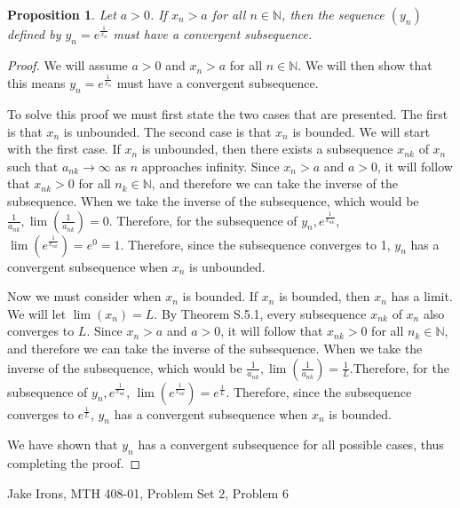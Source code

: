 \documentclass[11 pt]{article}
\newtheorem{proposition}{Proposition}
\newcommand{\newpar}{\vspace{.15in}\noindent}
\begin{document}
\newpar
\begin{proposition}
Let $a>0$. If $x_n>a$ for all $n\in\mathbb{N}$, then the sequence $(y_n)$ defined by $y_n=e^\frac{1}{x_n}$ must have a convergent subsequence.
\end{proposition}
\begin{proof}
\newpar 
We will assume $a>0$ and $x_n>a$ for all $n\in\mathbb{N}$. We will then show that this means $y_n=e^\frac{1}{x_n}$ must have a convergent subsequence.

\newpar
To solve this proof we must first state the two cases that are presented. The first is that $x_n$ is unbounded. The second case is that $x_n$ is bounded. We will start with the first case. If $x_n$ is unbounded, then there exists a subsequence ${x_{nk}}$ of ${x_n}$ such that ${a_{nk}}\rightarrow \infty$ as $n$ approaches infinity. Since $x_n>a$ and $a>0$, it will follow that $x_{nk}>0$ for all $n_k\in\mathbb{N}$, and therefore we can take the inverse of the subsequence. When we take the inverse of the subsequence, which would be $\frac{1}{a_{nk}}, \lim(\frac{1}{a_{nk}})=0$. Therefore, for the subsequence of $y_n, e^\frac{1}{x_{nk}}$, $\lim(e^\frac{1}{x_{nk}})=e^0=1$. Therefore, since the subsequence converges to 1, $y_n$ has a convergent subsequence when $x_n$ is unbounded.

\newpar
Now we must consider when $x_n$ is bounded. If $x_n$ is bounded, then $x_n$ has a limit. We will let $\lim(x_n)=L$. By Theorem S.5.1, every subsequence $x_{nk}$ of $x_n$ also converges to $L$. Since $x_n>a$ and $a>0$, it will follow that $x_{nk}>0$ for all $n_k\in\mathbb{N}$, and therefore we can take the inverse of the subsequence. When we take the inverse of the subsequence, which would be $\frac{1}{a_{nk}}, \lim(\frac{1}{a_{nk}})=\frac{1}{L}$.Therefore, for the subsequence of $y_n, e^\frac{1}{x_{nk}}$, $\lim(e^\frac{1}{x_{nk}})=e^\frac{1}{L}$. Therefore, since the subsequence converges to $e^\frac{1}{L}$, $y_n$ has a convergent subsequence when $x_n$ is bounded.

\newpar
We have shown that $y_n$ has a convergent subsequence for all possible cases, thus completing the proof.


\end{proof}
\newpage
\noindent Jake Irons, MTH 408-01, Problem Set 2, Problem 6
\end{document}
